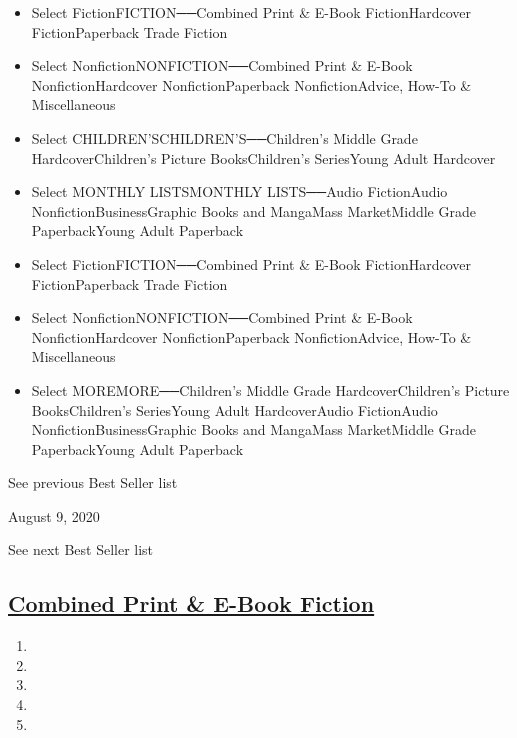 \begin{itemize}
\tightlist
\item
  Select FictionFICTION──Combined Print \& E-Book FictionHardcover
  FictionPaperback Trade Fiction
\item
  Select NonfictionNONFICTION──Combined Print \& E-Book
  NonfictionHardcover NonfictionPaperback NonfictionAdvice, How-To \&
  Miscellaneous
\item
  Select CHILDREN'SCHILDREN'S──Children's Middle Grade
  HardcoverChildren's Picture BooksChildren's SeriesYoung Adult
  Hardcover
\item
  Select MONTHLY LISTSMONTHLY LISTS──Audio FictionAudio
  NonfictionBusinessGraphic Books and MangaMass MarketMiddle Grade
  PaperbackYoung Adult Paperback
\end{itemize}

\begin{itemize}
\tightlist
\item
  Select FictionFICTION──Combined Print \& E-Book FictionHardcover
  FictionPaperback Trade Fiction
\item
  Select NonfictionNONFICTION──Combined Print \& E-Book
  NonfictionHardcover NonfictionPaperback NonfictionAdvice, How-To \&
  Miscellaneous
\item
  Select MOREMORE──Children's Middle Grade HardcoverChildren's Picture
  BooksChildren's SeriesYoung Adult HardcoverAudio FictionAudio
  NonfictionBusinessGraphic Books and MangaMass MarketMiddle Grade
  PaperbackYoung Adult Paperback
\end{itemize}

\href{/books/best-sellers/2020/08/02/}{}

See previous Best Seller list

August 9, 2020

See next Best Seller list

\hypertarget{combined-print--e-book-fiction}{%
\subsection{\texorpdfstring{\href{/books/best-sellers/combined-print-and-e-book-fiction/}{Combined
Print \& E-Book
Fiction}}{Combined Print \& E-Book Fiction}}\label{combined-print--e-book-fiction}}

\begin{enumerate}
\def\labelenumi{\arabic{enumi}.}
\tightlist
\item
\item
\item
\item
\item
\end{enumerate}

